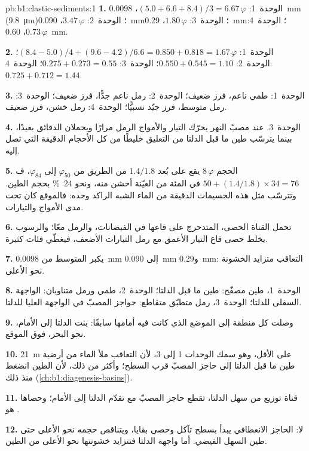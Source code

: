 \begin{solution}{pb:b1:clastic-sediments:1}
\textbf{1.} الوحدة~1: $(5.0 + 6.6 + 8.4)/3 = 6.67\,\varphi$، \qty{0.0098}{mm}
(\qty{9.8}{\micro m})؛ الوحدة~2: $3.47\,\varphi$، \qty{0.090}{mm}؛ الوحدة~3:
$1.80\,\varphi$، \qty{0.29}{mm}؛ الوحدة~4: $0.73\,\varphi$، \qty{0.60}{mm}.

\textbf{2.} الوحدة~1: $(8.4 - 5.0)/4 + (9.6 - 4.2)/6.6 = 0.850 + 0.818 =
1.67\,\varphi$؛ الوحدة~2: $0.550 + 0.545 = 1.10$؛ الوحدة~3: $0.275 + 0.273 = 0.55$؛
الوحدة~4: $0.725 + 0.712 = 1.44$.

\textbf{3.} الوحدة~1: طمي ناعم، فرز ضعيف؛ الوحدة~2: رمل ناعم جدًّا، فرز ضعيف؛ الوحدة~3: رمل متوسط، فرز جيّد نسبيًّا؛ الوحدة~4: رمل خشن، فرز ضعيف.

\textbf{4.} الوحدة~3. عند مصبّ النهر يحرّك التيار والأمواج الرمل مرارًا ويحملان الدقائق بعيدًا، بينما يترسّب طين ما قبل الدلتا من التعليق خليطًا من كل الأحجام الدقيقة التي تصل إليه.

\textbf{5.} الحجم $8\,\varphi$ يقع على بُعد $1.4/1.8$ من الطريق من
$\varphi_{50}$ إلى $\varphi_{84}$، ف$50 + (1.4/1.8) \times 34 = 76$ في المئة من
العيّنة أخشن منه، ونحو \qty{24}{\percent} بحجم الطين. وتترسّب مثل هذه الجسيمات الدقيقة من الماء الشبه الراكد وحده: فالموقع كان تحت مدى الأمواج والتيارات.

\textbf{6.} تحمل القناة الحصى، المتدحرج على قاعها في الفيضانات، والرمل معًا؛ والرسوب يخلط حصى قاع التيار الأعمق مع رمل التيارات الأضعف، فيغطّي فئات كثيرة.

\textbf{7.} يكبر المتوسط من \qty{0.0098}{mm} إلى \qty{0.090}{mm} و\qty{0.29}{mm}: التعاقب متزايد الخشونة نحو الأعلى.

\textbf{8.} الوحدة~1، طين مصفّح: طين ما قبل الدلتا؛ الوحدة~2، طمي ورمل متناوبان: الواجهة السفلى للدلتا؛ الوحدة~3، رمل متطبّق متقاطع: حواجز المصبّ في الواجهة العليا للدلتا.

\textbf{9.} وصلت كل منطقة إلى الموضع الذي كانت فيه أمامها سابقًا: بنت الدلتا إلى الأمام، نحو البحر، فوق الموقع.

\textbf{10.} \qty{21}{m} على الأقل، وهو سمك الوحدات 1 إلى 3، لأن التعاقب ملأ الماء من أرضية طين ما قبل الدلتا إلى حاجز المصبّ قرب السطح؛ وأكثر من ذلك، لأن الطين انضغط منذ ذلك (\cref{ch:b1:diagenesis-basins}).

\textbf{11.} قناة توزيع من سهل الدلتا، تقطع حاجز المصبّ مع تقدّم الدلتا إلى الأمام؛ وحصاها هو .

\textbf{12.} لا: الحاجز الانعطافي يبدأ بسطح تآكل وحصى بقايا، ويتناقص حجمه نحو الأعلى حتى طين السهل الفيضي. أما واجهة الدلتا فتتزايد خشونتها نحو الأعلى من الطين.


\end{solution}
